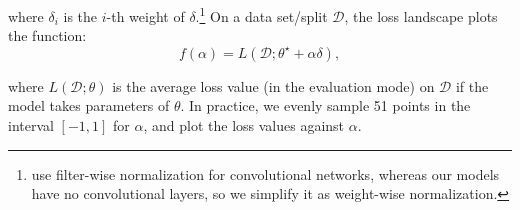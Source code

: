 \documentclass[11pt]{article}
\begin{document}
where $\delta_i$ is the $i$-th weight of $\delta$.\footnote{\citet{li2018visualizing} use filter-wise normalization for convolutional networks, whereas our models have no convolutional layers, so we simplify it as weight-wise normalization.} On a data set/split $\mathcal{D}$, the loss landscape plots the function: 
\begin{equation*}
    f(\alpha) = L(\mathcal{D}; \theta^\star + \alpha \delta),
\end{equation*}

where $L(\mathcal{D}; \theta)$ is the average loss value (in the evaluation mode) on $\mathcal{D}$ if the model takes parameters of $\theta$. In practice, we evenly sample 51 points in the interval $[-1, 1]$ for $\alpha$, and plot the loss values against $\alpha$. 
\end{document}
